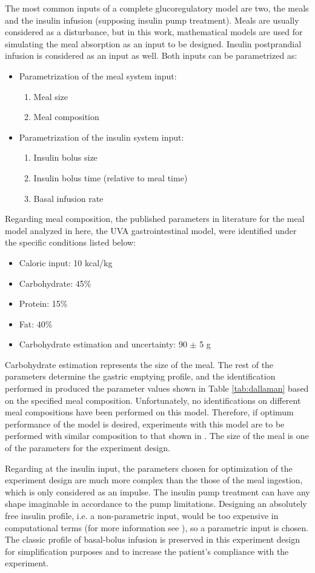 The most common inputs of a complete glucoregulatory model are two, the meals and the insulin infusion (supposing insulin pump treatment). Meals are usually considered as a disturbance, but in this work, mathematical models are used for simulating the meal absorption as an input to be designed. Insulin postprandial infusion is considered as an input as well. Both inputs can be parametrized as:
\begin{itemize}
	\item Parametrization of the meal system input:
\begin{enumerate}
	\item Meal size
	\item Meal composition
\end{enumerate}
	\item Parametrization of the insulin system input:
\begin{enumerate}
	\item Insulin bolus size
	\item Insulin bolus time (relative to meal time)
	\item Basal infusion rate
\end{enumerate}
\end{itemize}
Regarding meal composition, the published parameters in literature for the meal model analyzed in here, the UVA gastrointestinal model, were identified under the specific conditions listed below:
\begin{itemize}
	\item Caloric input: 10 kcal/kg
	\item Carbohydrate: 45\%
	\item Protein: 15\%
	\item Fat: 40\%
	\item Carbohydrate estimation and uncertainty: 90 $\pm$ 5 g
\end{itemize}
Carbohydrate estimation represents the size of the meal. The rest of the parameters determine the gastric emptying profile, and the identification performed in \cite{man2006system} produced the parameter values shown in Table \ref{tab:dallaman} based on the specified meal composition. Unfortunately, no identifications on different meal compositions have been performed on this model. Therefore, if optimum performance of the model is desired, experiments with this model are to be performed with similar composition to that shown in \cite{man2006system}. The size of the meal is  one of the parameters for the experiment design.

Regarding at the insulin input, the parameters chosen for optimization of the experiment design are much more complex than the those of the meal ingestion, which is only considered as an impulse. The insulin pump treatment can have any shape imaginable in accordance to the pump limitations. Designing an absolutely free insulin profile, i.e. a non-parametric input, would be too expensive in computational terms (for more information see \cite{walter1997}), so a parametric input is chosen. The classic profile of basal-bolus infusion is preserved in this experiment design for simplification purposes and to increase the patient's compliance with the experiment.

